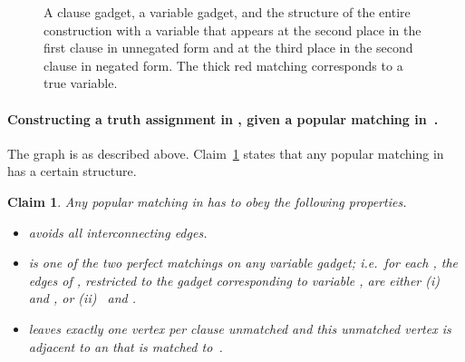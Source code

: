 \documentclass[11pt]{llncs}
\newtheorem{new-claim}{Claim}
\begin{document}
\begin{center}
\begin{figure}[h!]

\caption{A clause gadget, a variable gadget, and the structure of the entire construction with a variable that appears at the second place in the first clause in unnegated form and at the third place in the second clause in negated form. The thick red matching corresponds to a true variable.}
\label{fi:pop_np}
\end{figure}
\end{center}

\vspace*{-1cm}
	
\paragraph{Constructing a truth assignment in , given a popular matching  in~.}
The graph  is as described above. Claim~\ref{clm1:appb} states that any popular matching  in  has a certain structure.
\begin{new-claim}
\label{clm1:appb}
Any popular matching  in  has to obey the following properties.
\begin{itemize}
	\item  avoids all interconnecting edges.
	\item  is one of the two perfect matchings on any variable gadget; i.e.\ for each , the edges of , restricted to the gadget 
corresponding to variable , are either (i)~ and , or (ii)~ and .
	\item  leaves exactly one vertex per clause  unmatched and this unmatched vertex  is adjacent to an  that is 
matched to~.
\end{itemize}
\end{new-claim}
\end{document}
